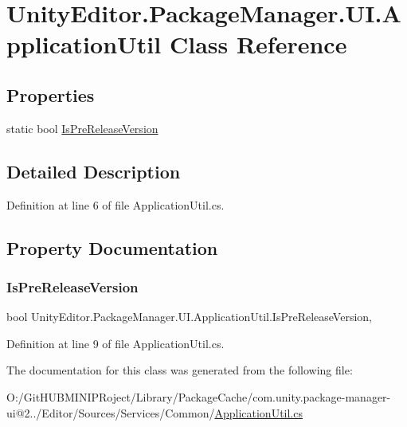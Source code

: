 \hypertarget{class_unity_editor_1_1_package_manager_1_1_u_i_1_1_application_util}{}\section{Unity\+Editor.\+Package\+Manager.\+U\+I.\+Application\+Util Class Reference}
\label{class_unity_editor_1_1_package_manager_1_1_u_i_1_1_application_util}
\subsection*{Properties}
\begin{DoxyCompactItemize}
\item 
static bool \mbox{\hyperlink{class_unity_editor_1_1_package_manager_1_1_u_i_1_1_application_util_a283b374c8b5dd57023669569874cf4fe}{Is\+Pre\+Release\+Version}}
\end{DoxyCompactItemize}


\subsection{Detailed Description}


Definition at line 6 of file Application\+Util.\+cs.



\subsection{Property Documentation}
\mbox{\label{class_unity_editor_1_1_package_manager_1_1_u_i_1_1_application_util_a283b374c8b5dd57023669569874cf4fe}} 
\subsubsection{\texorpdfstring{IsPreReleaseVersion}{IsPreReleaseVersion}}
{\footnotesize\ttfamily bool Unity\+Editor.\+Package\+Manager.\+U\+I.\+Application\+Util.\+Is\+Pre\+Release\+Version\hspace{0.3cm}{\ttfamily [static]}, {\ttfamily [get]}}



Definition at line 9 of file Application\+Util.\+cs.



The documentation for this class was generated from the following file\+:\begin{DoxyCompactItemize}
\item 
O\+:/\+Git\+H\+U\+B\+M\+I\+N\+I\+P\+Roject/\+Library/\+Package\+Cache/com.\+unity.\+package-\/manager-\/ui@2../\+Editor/\+Sources/\+Services/\+Common/\mbox{\hyperlink{_application_util_8cs}{Application\+Util.\+cs}}\end{DoxyCompactItemize}
